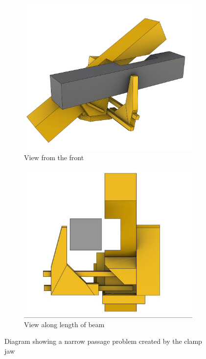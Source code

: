 \begin{figure}[!h]
    \centering
    \begin{subfigure}[b]{0.49\textwidth}
        \centering
        \includegraphics[width=\textwidth]{images/05/image15.jpg}
        \caption{View from the front}
    \end{subfigure}
    \hfill
    \begin{subfigure}[b]{0.49\textwidth}
        \centering
        \includegraphics[width=\textwidth]{images/05/image33.jpg}
        \caption{View along length of beam}
    \end{subfigure}
    \caption{Diagram showing a narrow passage problem created by the clamp jaw}
    \label{fig:narrow-passage-by-clamp-jaw}
\end{figure}

